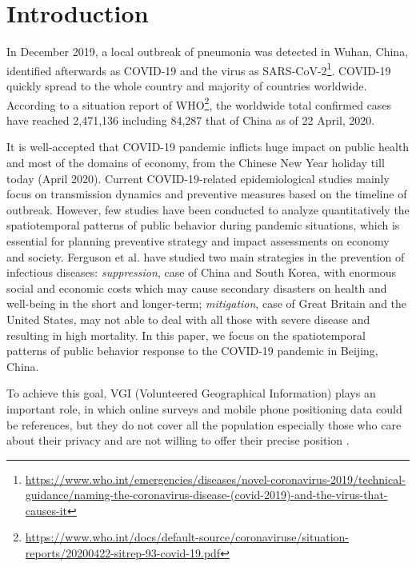 \documentclass[preprints,article,accept,moreauthors,pdftex]{Definitions/mdpi}
\begin{document}
\section{Introduction}
In December 2019, a local outbreak of pneumonia was detected in Wuhan, China, identified afterwards as COVID-19 and the virus as SARS-CoV-2\footnote{\url{https://www.who.int/emergencies/diseases/novel-coronavirus-2019/technical-guidance/naming-the-coronavirus-disease-(covid-2019)-and-the-virus-that-causes-it}}.
COVID-19 quickly spread to the whole country and majority of countries worldwide.
According to a situation report of WHO\footnote{\url{https://www.who.int/docs/default-source/coronaviruse/situation-reports/20200422-sitrep-93-covid-19.pdf}}, the worldwide total confirmed cases have reached 2,471,136 including 84,287 that of China as of 22 April, 2020.

It is well-accepted that COVID-19 pandemic inflicts huge impact on public health and most of the domains of economy, from the Chinese New Year holiday till today (April 2020).
Current COVID-19-related epidemiological studies mainly focus on transmission dynamics \cite{li2020early,pitzer2009demographic} and preventive measures \cite{chinazzi2020effect,van2006today} based on the timeline of outbreak.
However, few studies have been conducted to analyze quantitatively the spatiotemporal patterns of public behavior during pandemic situations, which is essential for planning preventive strategy and impact assessments on economy and society.
Ferguson et al. \cite{ferguson2020report} have studied two main strategies in the prevention of infectious diseases: \textit{suppression}, case of China and South Korea, with enormous social and economic costs which may cause secondary disasters on health and well-being in the short and longer-term;
\textit{mitigation}, case of Great Britain and the United States, may not able to deal with all those with severe disease and resulting in high mortality.
In this paper, we focus on the spatiotemporal patterns of public behavior response to the COVID-19 pandemic in Beijing, China.

To achieve this goal, VGI (Volunteered Geographical Information) plays an important role, in which online surveys and mobile phone positioning data could be references, but they do not cover all the population especially those who care about their privacy and are not willing to offer their precise position \cite{Li2016ISPRS}.  
\end{document}
